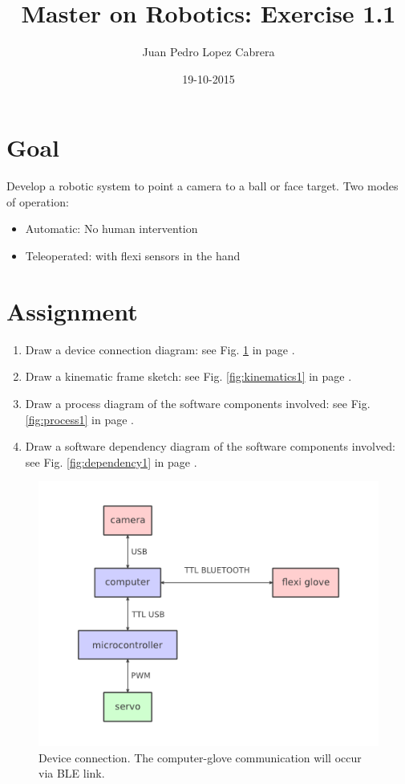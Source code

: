 \documentclass[a4paper]{article}
\title{Master on Robotics: Exercise 1.1}
\date{19-10-2015}
\author{Juan Pedro Lopez Cabrera}
\begin{document}
  \maketitle

  \newpage

  \section{Goal}
  Develop a robotic system to point a camera to a ball or face target.
  Two modes of operation:
  \begin{itemize}
    \item Automatic: No human intervention
    \item Teleoperated: with flexi sensors in the hand
  \end{itemize}

  \section{Assignment}
  \begin{enumerate}
    \item Draw a device connection diagram: see Fig. \ref{fig:connections1} in page \pageref{fig:connections1}.
    \item Draw a kinematic frame sketch: see Fig. \ref{fig:kinematics1} in page \pageref{fig:kinematics1}.
    \item Draw a process diagram of the software components involved: see Fig. \ref{fig:process1} in page \pageref{fig:process1}.
    \item Draw a software dependency diagram of the software components involved: see Fig. \ref{fig:dependency1} in page \pageref{fig:dependency1}.
  \end{enumerate}

  \begin{figure}[ht]
    \centering
    \includegraphics[scale=0.8]{RobocamDeviceConnections}
    \caption{Device connection. The computer-glove communication will occur via BLE link.}
    \label{fig:connections1}
  \end{figure}
\end{document}
